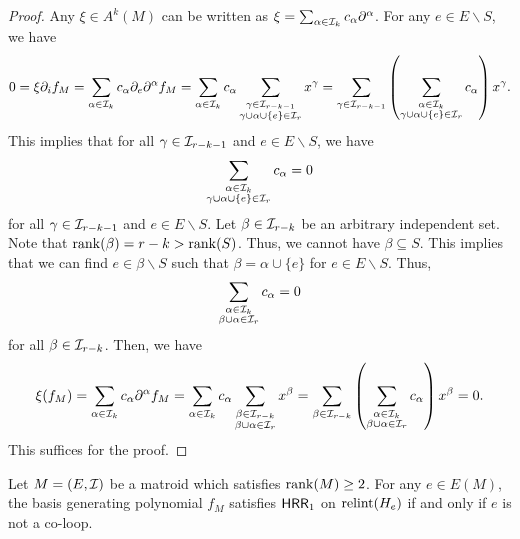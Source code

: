 \documentclass{puthesis-UG}
\begin{document}
\begin{proof}
	Any $\xi \in A^k(M)$ can be written as $\xi = \sum_{\alpha \in \mathcal{I}_k} c_\alpha \partial^\alpha$. For any $e \in E \backslash S$, we have 
	\begin{align*}
		0 = \xi \partial_i f_M = \sum_{\alpha \in \mathcal{I}_k} c_\alpha \partial_e \partial^\alpha f_M = \sum_{\alpha \in \mathcal{I}_k} c_\alpha \sum_{\substack{\gamma \in \mathcal{I}_{r-k-1} \\ \gamma \cup \alpha \cup \{e\} \in \mathcal{I}_r}} x^\gamma = \sum_{\gamma \in \mathcal{I}_{r-k-1}} \left ( \sum_{\substack{\alpha \in \mathcal{I}_k \\ \gamma \cup \alpha \cup \{e\} \in \mathcal{I}_r}} c_\alpha \right ) x^\gamma.
	\end{align*}
	This implies that for all $\gamma \in \mathcal{I}_{r-k-1}$ and $e \in E \backslash S$, we have 
	\[
		\sum_{\substack{\alpha \in \mathcal{I}_k \\ \gamma \cup \alpha \cup \{e\} \in \mathcal{I}_r}} c_\alpha = 0
	\]
	for all $\gamma \in \mathcal{I}_{r-k-1}$ and $e \in E \backslash S$. Let $\beta \in \mathcal{I}_{r-k}$ be an arbitrary independent set. Note that $\operatorname{rank} (\beta) = r-k > \operatorname{rank} (S)$. Thus, we cannot have $\beta \subseteq S$. This implies that we can find $e \in \beta \backslash S$ such that $\beta = \alpha \cup \{e\}$ for $e \in E \backslash S$. Thus, 
	\[
		\sum_{\substack{\alpha \in \mathcal{I}_k \\ \beta \cup \alpha \in \mathcal{I}_r}} c_\alpha = 0
	\]
	for all $\beta \in \mathcal{I}_{r-k}$. Then, we have 
	\[
		\xi (f_M) = \sum_{\alpha \in \mathcal{I}_k} c_\alpha \partial^\alpha f_M = \sum_{\alpha \in \mathcal{I}_k} c_\alpha \sum_{\substack{\beta \in \mathcal{I}_{r-k} \\ \beta \cup \alpha \in \mathcal{I}_r}} x^\beta = \sum_{\beta \in \mathcal{I}_{r-k}} \left ( \sum_{\substack{\alpha \in \mathcal{I}_k \\ \beta \cup \alpha \in \mathcal{I}_r}} c_\alpha \right ) x^\beta = 0.
	\]
	This suffices for the proof. 
\end{proof}

\begin{thm} \label{main-theorem}
	Let $M = (E, \mathcal{I})$ be a matroid which satisfies $\operatorname{rank} (M) \geq 2$. For any $e \in E(M)$, the basis generating polynomial $f_M$ satisfies $\mathsf{HRR}_1$ on $\operatorname{relint} (H_e)$ if and only if $e$ is not a co-loop.
\end{thm}
\end{document}
